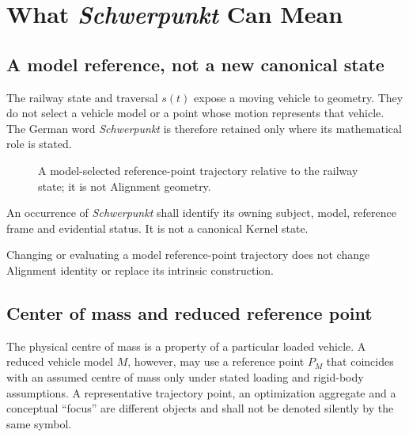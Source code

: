 \chapter{What \emph{Schwerpunkt} Can Mean}
\label{chap:schwerpunkt-state}

\section*{A model reference, not a new canonical state}

The railway state and traversal \(s(t)\) expose a moving vehicle to geometry.
They do not select a vehicle model or a point whose motion represents that
vehicle. The German word \emph{Schwerpunkt} is therefore retained only where
its mathematical role is stated.

\begin{figure}[htbp]
\centering

\caption{A model-selected reference-point trajectory relative to the railway state; it is not Alignment geometry.}
\label{fig:schwerpunkt-trajectory}
\end{figure}

\begin{principle}
\label{princ:schwerpunkt-principle}
An occurrence of \emph{Schwerpunkt} shall identify its owning subject, model,
reference frame and evidential status. It is not a canonical Kernel state.
\end{principle}

\begin{principle}
\label{princ:schwerpunkt-not-geometry}
Changing or evaluating a model reference-point trajectory does not change
Alignment identity or replace its intrinsic construction.
\end{principle}

\section{Center of mass and reduced reference point}

The physical centre of mass is a property of a particular loaded vehicle.
A reduced vehicle model \(M\), however, may use a reference point \(P_M\)
that coincides with an assumed centre of mass only under stated loading and
rigid-body assumptions. A representative trajectory point, an optimization
aggregate and a conceptual ``focus'' are different objects and shall not be
denoted silently by the same symbol.

